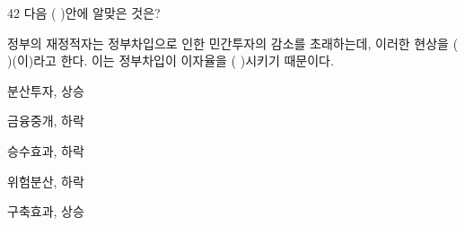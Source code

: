 \begin{question}{42}
다음 ( )안에 알맞은 것은?
\begin{framedtext}
정부의 재정적자는 정부차입으로 인한 민간투자의 감소를 초래하는데, 이러한 현상을 ( )(이)라고 한다. 이는 정부차입이 이자율을 ( )시키기 때문이다.
\end{framedtext}
\begin{choices}
  \item 분산투자, 상승
  \item 금융중개, 하락
  \item 승수효과, 하락
  \item 위험분산, 하락
  \item 구축효과, 상승
\end{choices}
\end{question}
